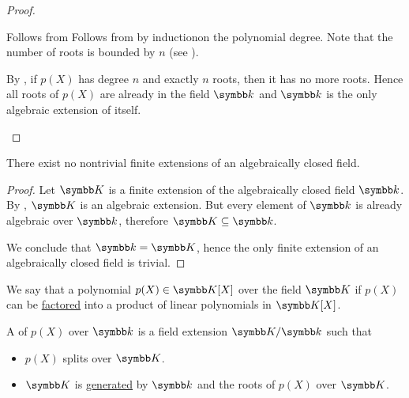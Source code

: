 \begin{proof}
\begin{description}
     Follows from  Follows from  by induction\IND on the polynomial degree. Note that the number of roots is bounded by \( n \) (see ).

     By , if \( p(X) \) has degree \( n \) and exactly \( n \) roots, then it has no more roots. Hence all roots of \( p(X) \) are already in the field \( \Bk \) and \( \Bk \) is the only algebraic extension of itself.
  \end{description}
\end{proof}

\begin{proposition}\label{thm:no_finite_extensions_of_closed_fields}
  There exist no nontrivial finite extensions of an algebraically closed field.
\end{proposition}
\begin{proof}
  Let \( \BK \) is a finite extension of the algebraically closed field \( \Bk \). By , \( \BK \) is an algebraic extension. But every element of \( \Bk \) is already algebraic over \( \Bk \), therefore \( \BK \subseteq \Bk \).

  We conclude that \( \Bk = \BK \), hence the only finite extension of an algebraically closed field is trivial.
\end{proof}

\begin{definition}\label{def:splitting_field}\cite[458]{Knapp2016BAlg}
  We say that a polynomial \( p(X) \in \BK[X] \) over the field \( \BK \)  if \( p(X) \) can be \hyperref[def:factorization_in_ring]{factored} into a product of linear polynomials in \( \BK[X] \).

  A  of \( p(X) \) over \( \Bk \) is a field extension \( \BK / \Bk \) such that
  \begin{itemize}
    \item \( p(X) \) splits over \( \BK \).
    \item \( \BK \) is \hyperref[def:generated_ring_ideal]{generated} by \( \Bk \) and the roots of \( p(X) \) over \( \BK \).
  \end{itemize}
\end{definition}

